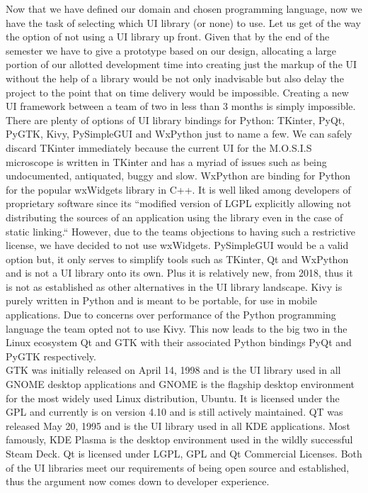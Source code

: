 Now that we have defined our domain and chosen programming language, now we have the task of selecting which UI library (or none) to use. Let us get of the way the option of not using a UI library up front. Given that by the end of the semester we have to give a prototype based on our design, allocating a large portion of our allotted development time into creating just the markup of the UI without the help of a library would be not only inadvisable but also delay the project to the point that on time delivery would be impossible. Creating a new UI framework between a team of two in less than 3 months is simply impossible.\\
There are plenty of options of UI library bindings for Python: TKinter, PyQt, PyGTK, Kivy, PySimpleGUI and WxPython just to name a few. We can safely discard TKinter immediately because the current UI for the M.O.S.I.S microscope is written in TKinter and has a myriad of issues such as being undocumented, antiquated, buggy and slow. WxPython are binding for Python for the popular wxWidgets library in C++. It is well liked among developers of proprietary software since its ``modified version of LGPL explicitly allowing not distributing the sources of an application using the library even in the case of static linking.``\cite{WxWidgetsWxWidgets2023} However, due to the teams objections to having such a restrictive license, we have decided to not use wxWidgets. PySimpleGUI would be a valid option but, it only serves to simplify tools such as TKinter, Qt and WxPython and is not a UI library onto its own. Plus it is relatively new, from 2018, thus it is not as established as other alternatives in the UI library landscape. Kivy is purely written in Python and is meant to be portable, for use in mobile applications. Due to concerns over performance of the Python programming language the team opted not to use Kivy. This now leads to the big two in the Linux ecosystem Qt and GTK with their associated Python bindings PyQt and PyGTK respectively.\\
GTK was initially released on April 14, 1998 and is the UI library used in all GNOME desktop applications and GNOME is the flagship desktop environment for the most widely used Linux distribution, Ubuntu.\cite{GNOME2023}\cite{Ubuntu2023} It is licensed under the GPL and currently is on version 4.10 and is still actively maintained. QT was released May 20, 1995 and is the UI library used in all KDE applications.\cite{QtSoftware2023} Most famously, KDE Plasma is the desktop environment used in the wildly successful Steam Deck.\cite{SteamDeck2023} Qt is licensed under LGPL, GPL and Qt Commercial Licenses.\cite{QtLicensingQt} Both of the UI libraries meet our requirements of being open source and established, thus the argument now comes down to developer experience.\\
